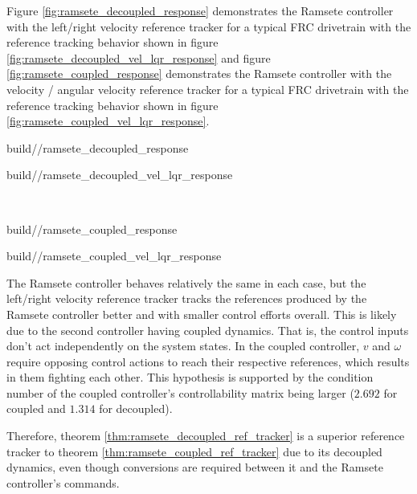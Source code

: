 Figure \ref{fig:ramsete_decoupled_response} demonstrates the Ramsete controller
with the left/right velocity \gls{reference} tracker for a typical FRC
drivetrain with the \gls{reference} tracking behavior shown in figure
\ref{fig:ramsete_decoupled_vel_lqr_response} and figure
\ref{fig:ramsete_coupled_response} demonstrates the Ramsete controller with the
velocity / angular velocity \gls{reference} tracker for a typical FRC drivetrain
with the \gls{reference} tracking behavior shown in figure
\ref{fig:ramsete_coupled_vel_lqr_response}.
\begin{bookfigure}
  \begin{minisvg}{2}{build/\chapterpath/ramsete_decoupled_response}
    \caption{Ramsete controller response with left/right velocity reference
      tracker ($b = 2$, $\zeta = 0.7$)}
    \label{fig:ramsete_decoupled_response}
  \end{minisvg}
  \hfill
  \begin{minisvg}{2}{build/\chapterpath/ramsete_decoupled_vel_lqr_response}
    \caption{Ramsete controller's left/right velocity reference tracker
      response}
    \label{fig:ramsete_decoupled_vel_lqr_response}
  \end{minisvg} \\
  \begin{minisvg}{2}{build/\chapterpath/ramsete_coupled_response}
    \caption{Ramsete controller response with velocity / angular velocity
      reference tracker ($b = 2$, $\zeta = 0.7$)}
    \label{fig:ramsete_coupled_response}
  \end{minisvg}
  \hfill
  \begin{minisvg}{2}{build/\chapterpath/ramsete_coupled_vel_lqr_response}
    \caption{Ramsete controller's velocity / angular velocity reference tracker
      response}
    \label{fig:ramsete_coupled_vel_lqr_response}
  \end{minisvg}
\end{bookfigure}

The Ramsete \gls{controller} behaves relatively the same in each case, but the
left/right velocity \gls{reference} tracker tracks the \glspl{reference}
produced by the Ramsete \gls{controller} better and with smaller
\glspl{control effort} overall. This is likely due to the second
\gls{controller} having coupled dynamics. That is, the control inputs don't act
independently on the system \glspl{state}. In the coupled \gls{controller}, $v$
and $\omega$ require opposing control actions to reach their respective
\glspl{reference}, which results in them fighting each other. This hypothesis is
supported by the condition number of the coupled \gls{controller}'s
controllability matrix being larger ($2.692$ for coupled and $1.314$ for
decoupled).

Therefore, theorem \ref{thm:ramsete_decoupled_ref_tracker} is a superior
\gls{reference} tracker to theorem \ref{thm:ramsete_coupled_ref_tracker} due to
its decoupled dynamics, even though conversions are required between it and the
Ramsete \gls{controller}'s commands.

